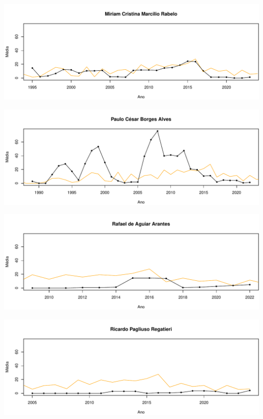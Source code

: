 \documentclass[12pt,brazil]{article}\usepackage[]{graphicx}\usepackage[]{xcolor}
\makeatletter
\def\maxwidth{ %
  \ifdim\Gin@nat@width>\linewidth
    \linewidth
  \else
    \Gin@nat@width
  \fi
}
\makeatother
\begin{document}
\vspace{0.5cm}


{\centering \includegraphics[width=\maxwidth]{figure/mediamovel-18} 

}



\vspace{0.5cm}


{\centering \includegraphics[width=\maxwidth]{figure/mediamovel-19} 

}



\vspace{0.5cm}


{\centering \includegraphics[width=\maxwidth]{figure/mediamovel-20} 

}



\vspace{0.5cm}


{\centering \includegraphics[width=\maxwidth]{figure/mediamovel-21} 

}
\end{document}

